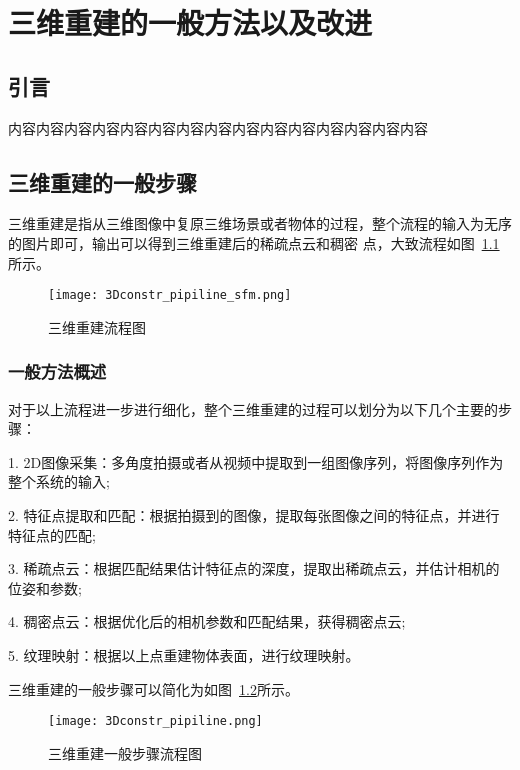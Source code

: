 \chapter{三维重建的一般方法以及改进}
\label{cha:chap3}
\section{引言}
\label{sec:3.1}
内容内容内容内容内容内容内容内容内容内容内容内容内容内容内容
\section{三维重建的一般步骤}
\label{sec:3.2}
三维重建是指从三维图像中复原三维场景或者物体的过程，整个流程的输入为无序的图片即可，输出可以得到三维重建后的稀疏点云和稠密
点，大致流程如图~\ref{fig:3Dconstr_pipiline_sfm}所示。
\begin{figure}[H] %
    \centering
    \texttt{[image: 3Dconstr\_pipiline\_sfm.png]}
    \caption{三维重建流程图}
    \label{fig:3Dconstr_pipiline_sfm}
    \end{figure}
\subsection{一般方法概述}
\label{sec:3.2.1}
对于以上流程进一步进行细化，整个三维重建的过程可以划分为以下几个主要的步骤：

1.  2D图像采集：多角度拍摄或者从视频中提取到一组图像序列，将图像序列作为整个系统的输入;

2.  特征点提取和匹配：根据拍摄到的图像，提取每张图像之间的特征点，并进行特征点的匹配;

3.  稀疏点云：根据匹配结果估计特征点的深度，提取出稀疏点云，并估计相机的位姿和参数;

4.  稠密点云：根据优化后的相机参数和匹配结果，获得稠密点云;

5.  纹理映射：根据以上点重建物体表面，进行纹理映射。

三维重建的一般步骤可以简化为如图~\ref{fig:3Dconstr_pipiline}所示。
\begin{figure}[H] %
    \centering
    \texttt{[image: 3Dconstr\_pipiline.png]}
    \caption{三维重建一般步骤流程图}
    \label{fig:3Dconstr_pipiline}
    \end{figure}

